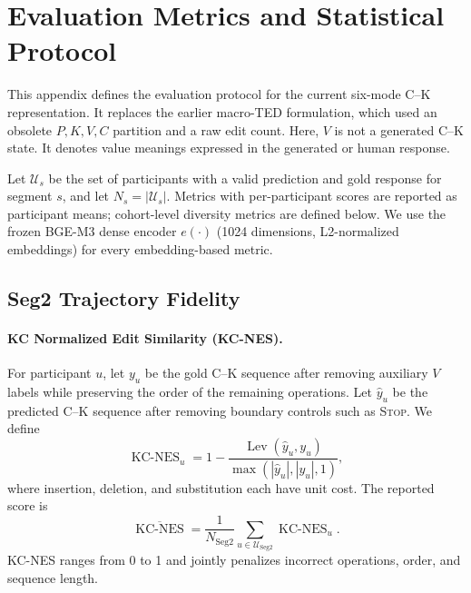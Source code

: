 \section{Evaluation Metrics and Statistical Protocol}
\label{app:evaluation_metrics}

This appendix defines the evaluation protocol for the current six-mode C--K representation. It replaces the earlier macro-TED formulation, which used an obsolete $P,K,V,C$ partition and a raw edit count. Here, $V$ is not a generated C--K state. It denotes value meanings expressed in the generated or human response.

Let $\mathcal U_s$ be the set of participants with a valid prediction and gold response for segment $s$, and let $N_s=|\mathcal U_s|$. Metrics with per-participant scores are reported as participant means; cohort-level diversity metrics are defined below. We use the frozen BGE-M3 dense encoder $e(\cdot)$ (1024 dimensions, L2-normalized embeddings) for every embedding-based metric.

\subsection{Seg2 Trajectory Fidelity}

\paragraph{KC Normalized Edit Similarity (KC-NES).}
For participant $u$, let $y_u$ be the gold C--K sequence after removing auxiliary $V$ labels while preserving the order of the remaining operations. Let $\hat y_u$ be the predicted C--K sequence after removing boundary controls such as \textsc{Stop}. We define
\begin{equation}
\operatorname{KC\text{-}NES}_u
=1-\frac{\operatorname{Lev}(\hat y_u,y_u)}
{\max(|\hat y_u|,|y_u|,1)},
\label{eq:kc_nes_individual}
\end{equation}
where insertion, deletion, and substitution each have unit cost. The reported score is
\begin{equation}
\overline{\operatorname{KC\text{-}NES}}
=\frac{1}{N_{\mathrm{Seg2}}}\sum_{u\in\mathcal U_{\mathrm{Seg2}}}
\operatorname{KC\text{-}NES}_u.
\label{eq:kc_nes}
\end{equation}
KC-NES ranges from 0 to 1 and jointly penalizes incorrect operations, order, and sequence length.

